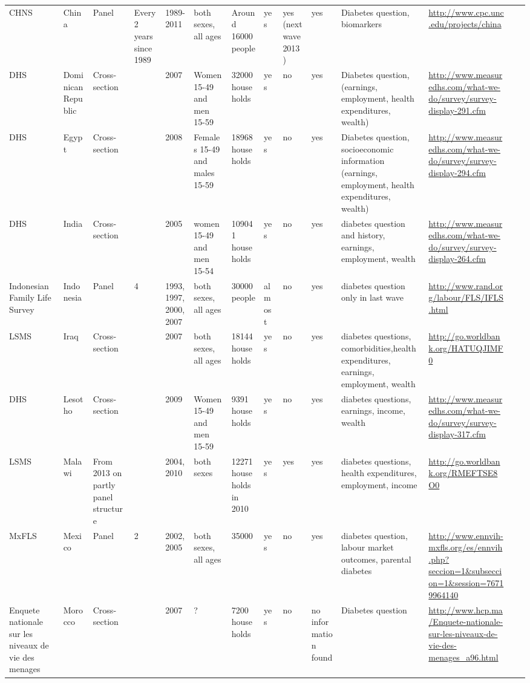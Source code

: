 \begin{landscape}
{\begin{tabularx}{\linewidth}{XXXXXXXXXXXXXX}
CHNS& China & Panel & Every 2 years since 1989 & 1989-2011 & both sexes, all ages & Around 16000 people & yes & yes (next wave 2013) & yes & Diabetes question, biomarkers & \url{http://www.cpc.unc.edu/projects/china} \\
DHS &  Dominican Republic & Cross-section &  & 2007 & Women 15-49 and men 15-59 & 32000 households & yes & no & yes & Diabetes question, (earnings, employment, health expenditures, wealth) & \url{http://www.measuredhs.com/what-we-do/survey/survey-display-291.cfm} \\
DHS & Egypt & Cross-section &  & 2008 & Females 15-49 and males 15-59 & 18968 households & yes & no & yes & Diabetes question, socioeconomic information (earnings, employment, health expenditures, wealth) &\url{http://www.measuredhs.com/what-we-do/survey/survey-display-294.cfm} \\
DHS & India & Cross-section &  & 2005 & women 15-49 and men 15-54 & 109041 households & yes & no & yes & diabetes question and history, earnings, employment, wealth & \url{http://www.measuredhs.com/what-we-do/survey/survey-display-264.cfm} \\
Indonesian Family Life Survey & Indonesia & Panel & 4 & 1993, 1997, 2000, 2007 & both sexes, all ages & 30000 people & almost & no & yes & diabetes question only in last wave & \url{http://www.rand.org/labour/FLS/IFLS.html} \\
LSMS & Iraq & Cross-section &  & 2007 & both sexes, all ages & 18144 households & yes & no & yes & diabetes questions, comorbidities,health expenditures, earnings, employment, wealth & \url{http://go.worldbank.org/HATUQJIMF0} \\
DHS & Lesotho & Cross-section &  & 2009 & Women 15-49 and men 15-59 & 9391 households & yes & no & yes & diabetes questions, earnings, income, wealth & \url{http://www.measuredhs.com/what-we-do/survey/survey-display-317.cfm} \\
LSMS & Malawi & From 2013 on partly panel structure &  & 2004, 2010 & both sexes & 12271 households in 2010 & yes & yes & yes & diabetes questions, health expenditures, employment, income & \url{http://go.worldbank.org/RMEFTSE8O0} \\
MxFLS & Mexico & Panel & 2 & 2002, 2005 & both sexes, all ages & 35000 & yes & no & yes & diabetes question, labour market outcomes, parental diabetes & \url{http://www.ennvih-mxfls.org/es/ennvih.php?seccion=1\&subseccion=1\&session=76719964140} \\
Enquete nationale sur les niveaux de vie des menages & Morocco & Cross-section &  & 2007 & ? & 7200 households & yes & no & no information found & Diabetes question & \url{http://www.hcp.ma/Enquete-nationale-sur-les-niveaux-de-vie-des-menages\_a96.html} \\

\end{tabularx}}
\end{landscape}
